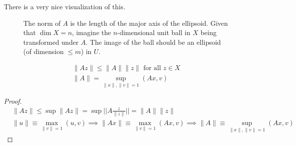   There is a very nice visualization of this. 

  \begin{figure}[H]
    \centering 
    \caption{The norm of $A$ is the length of the major axis of the ellipsoid. Given that $\dim{X}=n$, imagine the $n$-dimensional unit ball in $X$ being transformed under $A$. The image of the ball should be an ellipsoid (of dimension $\leq m$) in $U$. } 
    \label{fig:operator_norm}
  \end{figure}

  \begin{theorem}
    \begin{align}
      \|A z\| \leq \|A\| \|z\| \text{ for all } z \in X \\
      \|A\| = \sup_{\|x\|, \|v\| = 1} (A x, v)
    \end{align}
  \end{theorem}
  \begin{proof}
    \begin{align*}
      &\|A z\| \leq \sup{\|A z\|} = \sup{\Big|\Big| A \frac{z}{\|z\|} \Big|\Big|} = \|A\| \|z\| \\
      &\|u\| \equiv \max_{\|v\|=1} (u, v) \implies \|A x\| \equiv \max_{\|v\|=1} (Ax, v) \implies \|A\| \equiv \sup_{\|x\|, \|v\| =1} (A x, v)
    \end{align*}
  \end{proof}

